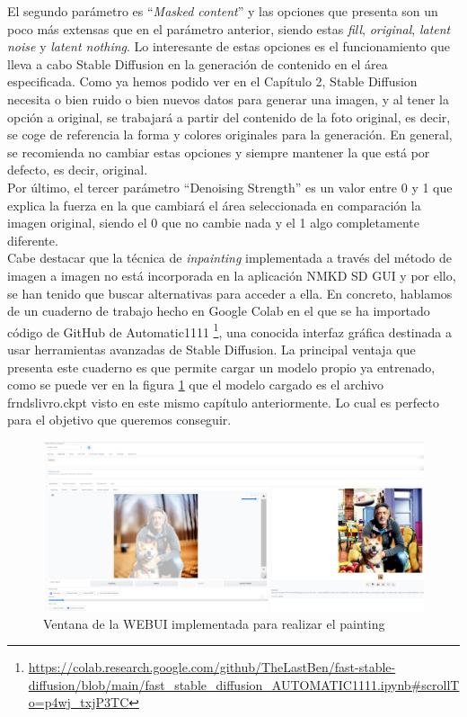 \begin{itemize}
El segundo parámetro es ``\textit{Masked content}'' y las opciones que presenta son un poco más extensas que en el parámetro anterior, siendo estas \textit{fill}, \textit{original}, \textit{latent noise} y \textit{latent nothing}. Lo interesante de estas opciones es el funcionamiento que lleva a cabo Stable Diffusion en la generación de contenido en el área especificada. Como ya hemos podido ver en el Capítulo 2, Stable Diffusion necesita o bien ruido o bien nuevos datos para generar una imagen, y al tener la opción a original, se trabajará a partir del contenido de la foto original, es decir, se coge de referencia la forma y colores originales para la generación. En general, se recomienda no cambiar estas opciones y siempre mantener la que está por defecto, es decir, original. \\

Por último, el tercer parámetro ``Denoising Strength'' es un valor entre 0 y 1 que explica la fuerza en la que cambiará el área seleccionada en comparación la imagen original, siendo el 0 que no cambie nada y el 1 algo completamente diferente. \\

Cabe destacar que la técnica de \textit{inpainting} implementada a través del método de imagen a imagen no está incorporada en la aplicación NMKD SD GUI y por ello, se han tenido que buscar alternativas para acceder a ella. En concreto, hablamos de un cuaderno de trabajo hecho en Google Colab en el que se ha importado código de GitHub de Automatic1111 \footnote{\url{https://colab.research.google.com/github/TheLastBen/fast-stable-diffusion/blob/main/fast_stable_diffusion_AUTOMATIC1111.ipynb#scrollTo=p4wj_txjP3TC}}, una conocida interfaz gráfica destinada a usar herramientas avanzadas de Stable Diffusion. La principal ventaja que presenta este cuaderno es que permite cargar un modelo propio ya entrenado, como se puede ver en la figura \ref{fig:inpainting1} que el modelo cargado es el archivo frndslivro.ckpt visto en este mismo capítulo anteriormente. Lo cual es perfecto para el objetivo que queremos conseguir. \\

\begin{figure}[h]
	\centering
	\includegraphics[width = 1
	\textwidth]{Imagenes/Vectorial/inpainting1.png}
	\caption{Ventana de la WEBUI implementada para realizar el painting}
	\label{fig:inpainting1}
\end{figure}


\end{itemize}
